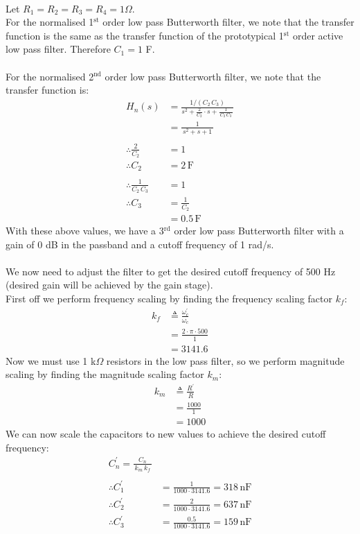 \\
Let $R_1 = R_2 = R_3 = R_4 = 1 \Omega$.\\
For the normalised 1$^\text{st}$ order low pass Butterworth filter, we note that the transfer function is the same as the transfer function of the prototypical 1$^\text{st}$ order active low pass filter. Therefore $C_1 = 1$ F.\\
\\
For the normalised 2$^\text{nd}$ order low pass Butterworth filter, we note that the transfer function is:
\begin{align*}
	H_n(s) &= \frac{1/(C_2 \, C_3)}{s^2 + \frac{2}{C_2} \cdot s + \frac{1}{\, C_2 \, C_3 \,}} \\
	&= \frac{1}{\, s^2 + s + 1 \,} \\
	\\
	\therefore \frac{2}{C_2} &= 1 \\
	\therefore C_2 &= 2 \, \text{F} \\
	\\
	\therefore \frac{1}{C_2 \, C_3} &= 1 \\
	\therefore C_3 &= \frac{1}{C_2} \\
	&= 0.5 \, \text{F}
\end{align*}
With these above values, we have a 3$^\text{rd}$ order low pass Butterworth filter with a gain of 0 dB in the passband and a cutoff frequency of 1 rad/s.\\
\\
We now need to adjust the filter to get the desired cutoff frequency of 500 Hz (desired gain will be achieved by the gain stage).\\
First off we perform frequency scaling by finding the frequency scaling factor $k_f$:
\begin{align*}
	k_f &\triangleq \frac{\omega_c^{'}}{\omega_c} \\
	&= \frac{2 \cdot \pi \cdot 500}{1} \\
	&= 3141.6
\end{align*}
Now we must use 1 k$\Omega$ resistors in the low pass filter, so we perform magnitude scaling by finding the magnitude scaling factor $k_m$:
\begin{align*}
	k_m &\triangleq \frac{R^{'}}{R} \\
	&= \frac{1000}{1} \\
	&= 1000
\end{align*}
We can now scale the capacitors to new values to achieve the desired cutoff frequency:
\begin{align*}
	C_n^{'} = \frac{C_n}{\, k_m \, k_f \,} \\
	\\
	\therefore C_1^{'} &= \frac{1}{1000 \cdot 3141.6} = 318 \, \text{nF} \\
	\therefore C_2^{'} &= \frac{2}{1000 \cdot 3141.6} = 637 \, \text{nF} \\
	\therefore C_3^{'} &= \frac{0.5}{1000 \cdot 3141.6} = 159 \, \text{nF}
\end{align*}

